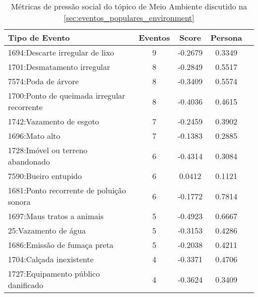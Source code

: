\begin{table}[htbp]
	\centering
	\caption{Métricas de pressão social do tópico de Meio Ambiente discutido na \autoref{sec:eventos_populares_environment}}
	\label{tab:eventos_populares_environment}
	\begin{tabular}{|l|c|c|c|c|}
		\hline
		\textbf{Tipo de Evento}                     & \textbf{Eventos} & \textbf{Score} & \textbf{Persona} \\
		\hline
		1694:Descarte irregular de lixo             & 9                & -0.2679        & 0.3349           \\
		\hline
		1701:Desmatamento irregular                 & 8                & -0.2849        & 0.5517           \\
		\hline
		7574:Poda de árvore                         & 8                & -0.3409        & 0.5574           \\
		\hline
		1700:Ponto de queimada irregular recorrente & 8                & -0.4036        & 0.4615           \\
		\hline
		1742:Vazamento de esgoto                    & 7                & -0.2459        & 0.3902           \\
		\hline
		1696:Mato alto                              & 7                & -0.1383        & 0.2885           \\
		\hline
		1728:Imóvel ou terreno abandonado           & 6                & -0.4314        & 0.3084           \\
		\hline
		7590:Bueiro entupido                        & 6                & 0.0412         & 0.1121           \\
		\hline
		1681:Ponto recorrente de poluição sonora    & 6                & -0.1772        & 0.7814           \\
		\hline
		1697:Maus tratos a animais                  & 5                & -0.4923        & 0.6667           \\
		\hline
		25:Vazamento de água                        & 5                & -0.3153        & 0.4286           \\
		\hline
		1686:Emissão de fumaça preta                & 5                & -0.2038        & 0.4211           \\
		\hline
		1704:Calçada inexistente                    & 4                & -0.3371        & 0.4706           \\
		\hline
		1727:Equipamento público danificado         & 4                & -0.3624        & 0.3409           \\

\end{tabular}
\end{table}
